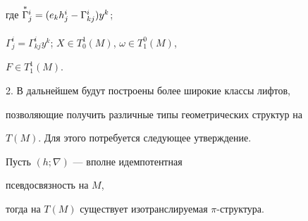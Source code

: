 где $\overset{*}{\underset{}{\Gamma}}{}^i_j=(e_k h^i_j-\Gamma^i_{kj})y^k$;


$\Gamma^i_j=\Gamma^i_{kj}y^k$; $X\in T^1_0(M)$, $\omega\in T^0_1(M)$,


$F\in T^1_1(M)$.


\medskip





2. В дальнейшем будут построены более широкие классы лифтов,


позволяющие получить различные типы геометрических структур на


$T(M)$. Для этого потребуется следующее утверждение.





\begin{thm} Пусть $(h;\nabla)$ --- вполне идемпотентная


псевдосвязность на $M$,


тогда на $T(M)$ существует изотранслируемая $\pi$-структура.


\end{thm}






